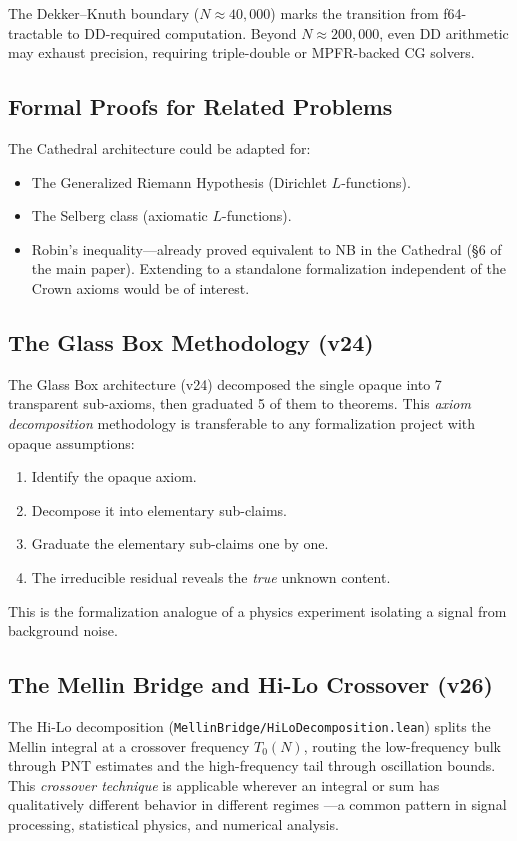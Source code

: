 \documentclass[11pt,a4paper]{article}
\begin{document}
The Dekker--Knuth boundary ($N \approx 40{,}000$) marks the
transition from f64-tractable to DD-required computation. Beyond
$N \approx 200{,}000$, even DD arithmetic may exhaust precision,
requiring triple-double or MPFR-backed CG solvers.

\subsection{Formal Proofs for Related Problems}

The Cathedral architecture could be adapted for:
\begin{itemize}
  \item The Generalized Riemann Hypothesis (Dirichlet $L$-functions).
  \item The Selberg class (axiomatic $L$-functions).
  \item Robin's inequality---already proved equivalent to NB
    in the Cathedral (\S6 of the main paper). Extending to
    a standalone formalization independent of the Crown axioms
    would be of interest.
\end{itemize}

\subsection{The Glass Box Methodology (v24)}

The Glass Box architecture (v24) decomposed the single opaque
 into 7 transparent sub-axioms,
then graduated 5 of them to theorems. This \emph{axiom
decomposition} methodology is transferable to any formalization
project with opaque assumptions:
\begin{enumerate}
  \item Identify the opaque axiom.
  \item Decompose it into elementary sub-claims.
  \item Graduate the elementary sub-claims one by one.
  \item The irreducible residual reveals the \emph{true} unknown
    content.
\end{enumerate}
This is the formalization analogue of a physics experiment
isolating a signal from background noise.

\subsection{The Mellin Bridge and Hi-Lo Crossover (v26)}

The Hi-Lo decomposition (\texttt{MellinBridge/HiLoDecomposition.lean})
splits the Mellin integral at a crossover frequency $T_0(N)$,
routing the low-frequency bulk through PNT estimates and the
high-frequency tail through oscillation bounds. This
\emph{crossover technique} is applicable wherever an integral
or sum has qualitatively different behavior in different regimes
---a common pattern in signal processing, statistical physics,
and numerical analysis.
\end{document}
